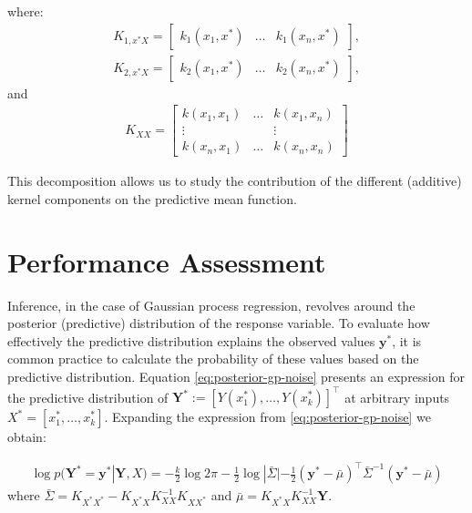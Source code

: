 where:
\begin{gather*}
    K_{1, x^{\ast}X} =
    \begin{bmatrix}
        k_1(x_1, x^{\ast}) & \dots & k_1(x_n,  x^{\ast})
    \end{bmatrix}, \\
    K_{2, x^{\ast}X} =
    \begin{bmatrix}
        k_2(x_1, x^{\ast}) & \dots & k_2(x_n,  x^{\ast})
    \end{bmatrix},
\end{gather*}
and
\begin{gather*}
        K_{XX} =
    \begin{bmatrix}
        k(x_1, x_1) & \dots & k(x_1, x_n)\\
        \vdots  &  & \vdots \\
        k(x_n, x_1) & \dots  & k(x_n, x_n)
    \end{bmatrix}
\end{gather*}

This decomposition allows us to study
the contribution of the different (additive) kernel components on the predictive mean function.


\section{Performance Assessment}\label{sec:performance-assessment}
Inference, in the case of Gaussian process regression, revolves around the posterior (predictive) distribution
of the response variable.
To evaluate how effectively the predictive distribution explains the observed values
$\mathbf{y^{\ast}}$,
it is common practice to calculate the probability of these values based on the predictive distribution.
Equation \ref{eq:posterior-gp-noise} presents an expression for the predictive distribution of
$\mathbf{Y^{\ast}}:= [Y(x_1^{\ast}), \dots, Y(x_k^{\ast})]^{\top}$ at arbitrary inputs
$X^{\ast} = [x_1^{\ast}, \dots, x_k^{\ast}]$.
Expanding the expression from \ref{eq:posterior-gp-noise} we obtain:

\begin{gather}\label{eq:predictive-dist}
    \log p(\mathbf{Y^{\ast}} = \mathbf{y^{\ast}}| \mathbf{Y}, X) =
    -\frac{k}{2} \log 2 \pi - \frac{1}{2} \log|\bar{\Sigma}| -
        \frac{1}{2}(\mathbf{y^{\ast}} - \bar{\mu})^{\top} \bar{\Sigma}^{-1} (\mathbf{y^{\ast}} - \bar{\mu})
\end{gather}
where
$\bar{\Sigma} = K_{X^{\ast}X^{\ast}} - K_{X^{\ast}X} K_{XX}^{-1} K_{XX^{\ast}}$
and $\bar{\mu} = K_{X^{\ast}X} K_{XX}^{-1} \mathbf{Y}$.

